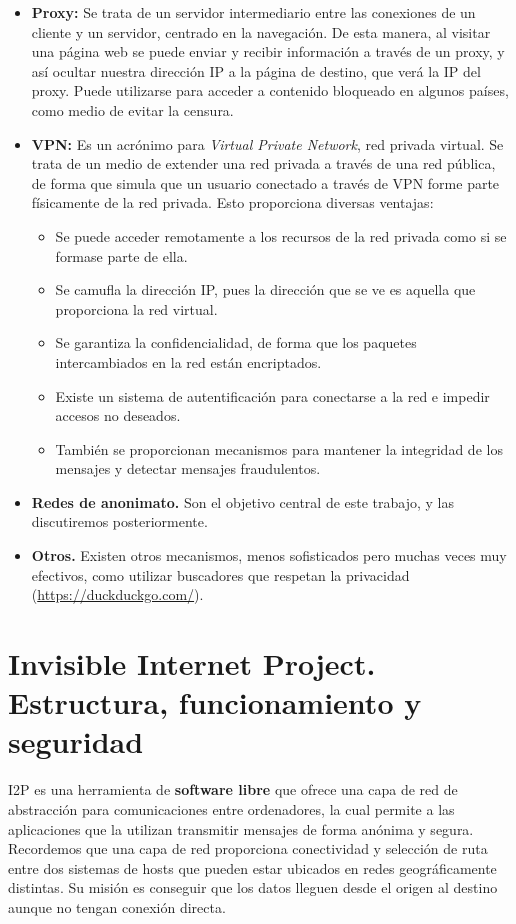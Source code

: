 \begin{itemize}
\item \textbf{Proxy:} Se trata de un servidor intermediario entre las conexiones de un cliente y un servidor, centrado en la navegación. De esta manera, al visitar una página web se puede enviar y recibir información a través de un proxy, y así ocultar nuestra dirección IP a la página de destino, que verá la IP del proxy. Puede utilizarse para acceder a contenido bloqueado en algunos países, como medio de evitar la censura.
\item \textbf{VPN:} Es un acrónimo para \textit{Virtual Private Network}, red privada virtual. Se trata de un medio de extender una red privada a través de una red pública, de forma que simula que un usuario conectado a través de VPN forme parte físicamente de la red privada. Esto proporciona diversas ventajas:

\begin{itemize}
	\item Se puede acceder remotamente a los recursos de la red privada como si se formase parte de ella.
	\item Se camufla la dirección IP, pues la dirección que se ve es aquella que proporciona la red virtual.
	\item Se garantiza la confidencialidad, de forma que los paquetes intercambiados en la red están encriptados.
	\item Existe un sistema de autentificación para conectarse a la red e impedir accesos no deseados.
	\item También se proporcionan mecanismos para mantener la integridad de los mensajes y detectar mensajes fraudulentos.
\end{itemize}	
\item \textbf{Redes de anonimato.} Son el objetivo central de este trabajo, y las discutiremos posteriormente.
\item \textbf{Otros.} Existen otros mecanismos, menos sofisticados pero muchas veces muy efectivos, como utilizar buscadores que respetan la privacidad (\url{https://duckduckgo.com/}).
\end{itemize}

\section{Invisible Internet Project. Estructura, funcionamiento y seguridad}

I2P es una herramienta de \textbf{software libre} que ofrece una capa de red de abstracción para comunicaciones entre ordenadores, la cual permite a las aplicaciones que la utilizan transmitir mensajes de forma anónima y segura. Recordemos que una capa de red proporciona conectividad y selección de ruta entre dos sistemas de hosts que pueden estar ubicados en redes geográficamente distintas. Su misión es conseguir que los datos lleguen desde el origen al destino aunque no tengan conexión directa.\\

